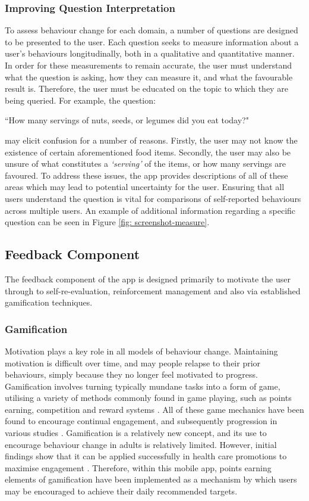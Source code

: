 \subsubsection{Improving Question Interpretation}
To assess behaviour change for each domain, a number of questions are designed to be presented to the user. Each question seeks to measure information about a user's behaviours longitudinally, both in a qualitative and quantitative manner. In order for these measurements to remain accurate, the user must understand what the question is asking, how they can measure it, and what the favourable result is. Therefore, the user must be educated on the topic to which they are being queried.
For example, the question:
\begin{displayquote}
``How many servings of nuts, seeds, or legumes did you eat today?"
\end{displayquote}
may elicit confusion for a number of reasons. Firstly, the user may not know the existence of certain aforementioned food items. Secondly, the user may also be unsure of what constitutes a \textit{`serving'} of the items, or how many servings are favoured.
To address these issues, the app provides descriptions of all of these areas which may lead to potential uncertainty for the user. Ensuring that all users understand the question is vital for comparisons of self-reported behaviours across multiple users. An example of additional information regarding a specific question can be seen in Figure \ref{fig: screenshot-measure}.

\subsection{Feedback Component}
The feedback component of the app is designed primarily to motivate the user through to self-re-evaluation, reinforcement management and also via established gamification techniques.

\subsubsection{Gamification}
Motivation plays a key role in all models of behaviour change. Maintaining motivation is difficult over time, and may people relapse to their prior behaviours, simply because they no longer feel motivated to progress. Gamification involves turning typically mundane tasks into a form of game, utilising a variety of methods commonly found in game playing, such as points earning, competition and reward systems \cite{Deterding2011a}. All of these game mechanics have been found to encourage continual engagement, and subsequently progression in various studies \cite{Hamari2014}. Gamification is a relatively new concept, and its use to encourage behaviour change in adults is relatively limited. However, initial findings show that it can be applied successfully in health care promotions to maximise engagement \cite{Schoech2013}. Therefore, within this mobile app, points earning elements of gamification have been implemented as a mechanism by which users may be encouraged to achieve their daily recommended targets.

